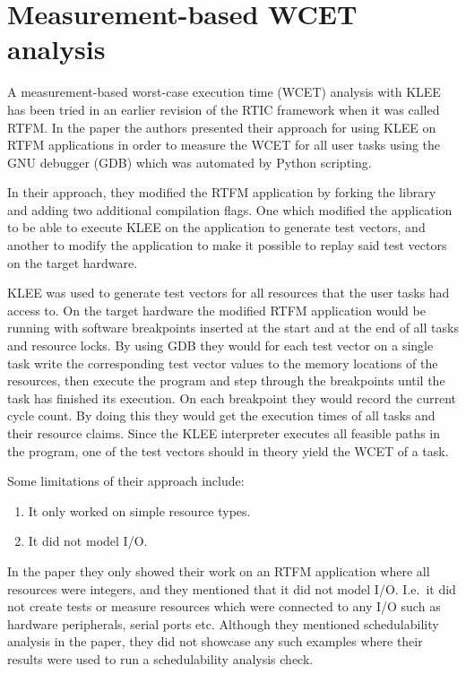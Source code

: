 \section{Measurement-based WCET analysis}
A measurement-based worst-case execution time (WCET) analysis with KLEE has
been tried in an earlier revision of the RTIC framework when it was called
RTFM\cite{lindner}. In the paper the authors presented their approach for using
KLEE on RTFM applications in order to measure the WCET for all user tasks
using the GNU debugger (GDB) which was automated by Python scripting.

In their approach, they modified the RTFM application by forking the library and
adding two additional compilation flags. One which modified the application to be
able to execute KLEE on the application to generate test vectors, and another
to modify the application to make it possible to replay said test vectors on
the target hardware.

KLEE was used to generate test vectors for all resources that the user tasks
had access to. On the target hardware the modified RTFM application would be
running with software breakpoints inserted at the start and at the end of all
tasks and resource locks. By using GDB they would for each test vector on a
single task write the corresponding test vector values to the memory locations
of the resources, then execute the program and step through the breakpoints
until the task has finished its execution. On each breakpoint they would record
the current cycle count. By doing this they would get the execution times of
all tasks and their resource claims. Since the KLEE interpreter executes all
feasible paths in the program, one of the test vectors should in theory yield
the WCET of a task.

Some limitations of their approach include:
\begin{enumerate}
    \item It only worked on simple resource types.
    \item It did not model I/O.
\end{enumerate}
In the paper they only showed their work on an RTFM application where all
resources were integers, and they mentioned that it did not model I/O. I.e.\
it did not create tests or measure resources which were connected to any I/O
such as hardware peripherals, serial ports etc. Although they mentioned
schedulability analysis in the paper, they did not showcase any such examples
where their results were used to run a schedulability analysis check.


